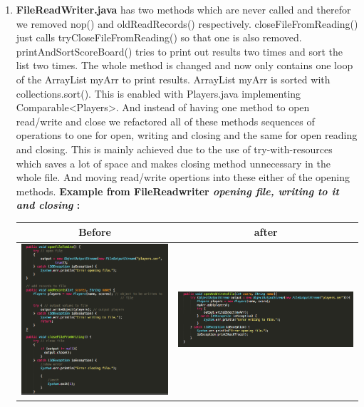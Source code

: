 \documentclass{article}
\begin{document}
\begin{enumerate}
	\item
	\textbf{FileReadWriter.java}
	has two methods which are never called and therefor we removed nop() and oldReadRecords() respectively.
	closeFileFromReading() just calls tryCloseFileFromReading() so that one is also removed.
	printAndSortScoreBoard() tries to print out results two times and sort the list two times.
	The whole method is changed and now only contains one loop of the ArrayList myArr to print results. ArrayList myArr is sorted with collections.sort(). This is enabled with Players.java implementing Comparable<Players>.
	And instead of having one method to open read/write and close we refactored all of these methods sequences of operations to one for open, writing and closing and the same for open reading and closing. This is mainly achieved due to the use of try-with-resources which saves a lot of space and makes closing method unnecessary in the whole file. And moving read/write opertions into these either of the opening methods. 
	\textbf{Example from FileReadwriter \textit{opening file, writing to it and closing} :\newline}
	\hspace*{-1.5cm}
	\begin{tabulary}{0.5\textwidth}{| c | c |}
	 \hline
	 Before & after \\ \hline
	\includegraphics[scale=0.4]{FileReadWriter-EXAMPLE-BEFORE.png} & \includegraphics[scale=0.4]{FileReaderWriter-EXAMPLE-AFTER.png} \\ \hline
	\end{tabulary}


\end{enumerate}
\end{document}
